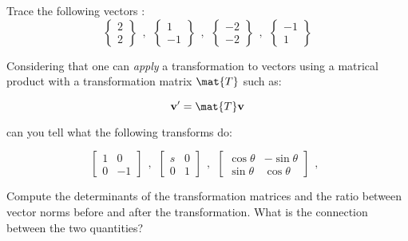 \bexo
Trace the following vectors :
\begin{equation}
	\begin{Bmatrix} 2\\2 \end{Bmatrix}
	~~,~~
	\begin{Bmatrix} 1\\-1 \end{Bmatrix}
	~~,~~
	\begin{Bmatrix} -2\\-2 \end{Bmatrix}
	~~,~~
	\begin{Bmatrix} -1\\1 \end{Bmatrix}
\end{equation}

Considering that one can \textit{apply} a transformation to vectors using a matrical
product with a transformation matrix $\mat{T}$ such as:

\begin{equation}
	\mathbf{v'} = \mat{T}\mathbf{v}
\end{equation}

can you tell what the following transforms do:

\begin{equation}
	\begin{bmatrix}
		1& 0\\
		0& -1
	\end{bmatrix}
	~~,~~
	\begin{bmatrix}
		s& 0\\
		0& 1
	\end{bmatrix}
	~~,~~
	\begin{bmatrix}
		\cos\theta& -\sin\theta\\
		\sin\theta& \cos\theta
	\end{bmatrix}
	~~,~~
\end{equation}

Compute the determinants of the transformation matrices and the ratio between vector norms
before and after the transformation. What is the connection between the two quantities?

\eexo

